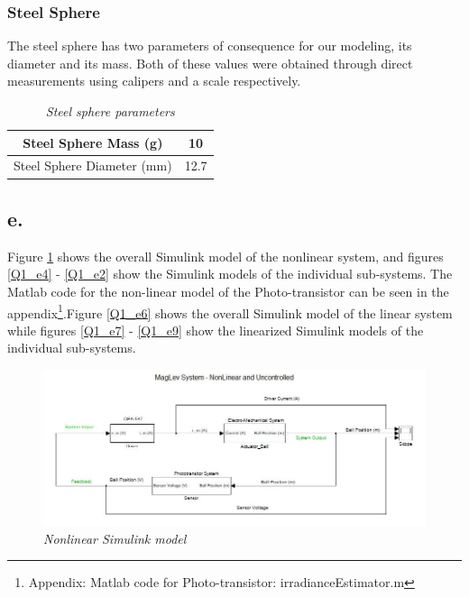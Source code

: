 \documentclass{article}
\theoremstyle{plain}
\theoremstyle{definition}
\theoremstyle{remark}
\begin{document}
\subsubsection*{Steel Sphere}
The steel sphere has two parameters of consequence for our modeling, its diameter and its mass.  Both of these values were obtained through direct measurements using calipers and a scale respectively.

\begin{table}[hbt]
\begin{center}
    \begin{tabular}{|c|c|}
        \hline
        Steel Sphere Mass (g)      & 10   \\ \hline
        Steel Sphere Diameter (mm) & 12.7 \\
        \hline
    \end{tabular}
\caption{\emph{Steel sphere parameters}}
\label{Q1_dt3}
\end{center}
\end{table}


\subsection*{e.}
Figure \ref{Q1_e1}  shows the overall Simulink model of the nonlinear system, and figures \ref{Q1_e4} - \ref{Q1_e2} show the Simulink models of the individual sub-systems. The Matlab code for the non-linear model of the Photo-transistor can be seen in the appendix\footnote{Appendix: Matlab code for Photo-transistor: irradianceEstimator.m }.Figure \ref{Q1_e6}  shows the overall Simulink model of the linear system while figures \ref{Q1_e7} - \ref{Q1_e9} show the linearized Simulink models of the individual sub-systems.\\
\begin{figure}
\begin{center}
\includegraphics[width = 15cm]{NonLinearUnControlledComplete}
\caption{\emph{Nonlinear Simulink model}}
\label{Q1_e1}
\end{center}
\end{figure}
\end{document}
